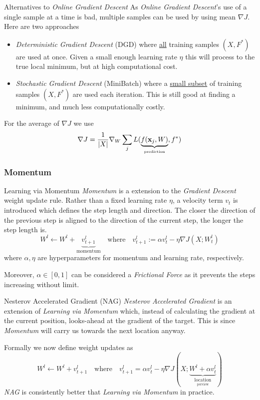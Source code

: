 \documentclass[11pt,a4paper]{article}
\begin{document}
  \begin{definition}{Alternatives to \textit{Online Gradient Descent}}
    As \textit{Online Gradient Descent}'s use of a single sample at a time is bad, multiple samples can be used by using mean $\nabla J$. Here are two approaches
    \begin{itemize}
      \item \textit{Deterministic Gradient Descent} (DGD) where \underline{all} training samples $(X,F^*)$ are used at once. Given a small enough learning rate $\eta$ this will process to the true local minimum, but at high computational cost.
      \item \textit{Stochastic Gradient Descent} (MiniBatch) where a \underline{small subset} of training samples $(X,F^*)$ are used each iteration. This is still good at finding a minimum, and much less computationally costly.
    \end{itemize}
    For the average of $\nabla J$ we use
    \[ \nabla J=\frac1{|X|}\nabla_W\sum_j L(\underbrace{f(\mathbf{x}_j,W)}_\text{\tiny prediction},f^*) \]
  \end{definition}

\subsubsection{Momentum} \label{sec_Momentum}

  \begin{definition}{Learning via Momentum}
    \textit{Momentum} is a extension to the \textit{Gradient Descent} weight update rule. Rather than a fixed learning rate $\eta$, a velocity term $v_t$ is introduced which defines the step length and direction. The closer the direction of the previous step is aligned to the direction of the current step, the longer the step length is.
    \[ W^l\leftarrow W^l+\underbrace{v^l_{t+1}}_\text{momentum}\quad\text{where}\quad v^l_{t+1}:=\alpha v^l_t-\eta\nabla J(X;W_t^l) \]
    where $\alpha,\eta$ are hyperparameters for momentum and learning rate, respectively.
    \par Moreover, $\alpha\in[0,1]$ can be considered a \textit{Frictional Force} as it prevents the steps increasing without limit.
  \end{definition}

  \begin{proposition}{Nesterov Accelerated Gradient (NAG)}
    \textit{Nesterov Accelerated Gradient} is an extension of \textit{Learning via Momentum} which, instead of calculating the gradient at the current position, looks-ahead at the gradient of the target. This is since \textit{Momentum} will carry us towards the next location anyway.
    \par Formally we now define weight updates as
    \[ W^l\leftarrow W^l+v^l_{t+1}\quad\text{where}\quad v^l_{t+1}=\alpha v^l_t-\eta\nabla J(X;\underbrace{W^l+\alpha v^l_t}_{ \underset{\text{perview}}{\text{location}}}) \]
    \textit{NAG} is consistently better that \textit{Learning via Momentum} in practice.
  \end{proposition}
\end{document}

